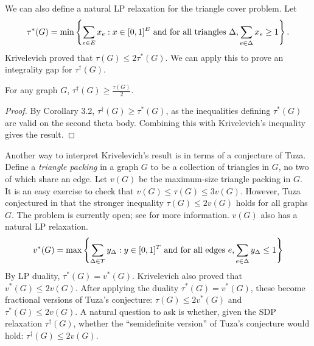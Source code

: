 We can also define a natural LP relaxation for the triangle cover problem. Let
$$\tau^*(G) = \min \left\{\sum_{e \in E} x_e: x \in [0,1]^E \hbox{ and for all triangles $\Delta$,} \sum_{e \in \Delta} x_e \ge 1\right\}.$$
Krivelevich \cite{krivelevich} proved that $\tau(G) \le 2\tau^*(G)$. We can apply this to prove an integrality gap for $\tau^\dagger(G)$.
\begin{theorem}
For any graph $G$, $\tau^\dagger(G) \ge \frac{\tau(G)}{2}$.
\end{theorem}
\begin{proof}
By Corollary 3.2, $\tau^\dagger(G) \ge \tau^*(G)$, as the inequalities defining $\tau^*(G)$ are valid on the second theta body. Combining this with Krivelevich's inequality gives the result.
\end{proof}

Another way to interpret Krivelevich's result is in terms of a conjecture of Tuza. Define a {\it triangle packing} in a graph $G$ to be a collection of triangles in $G$, no two of which share an edge. Let $v(G)$ be the maximum-size triangle packing in $G$. It is an easy exercise to check that $v(G) \le \tau(G) \le 3v(G)$. However, Tuza conjectured in \cite{tuza} that the stronger inequality $\tau(G) \le 2v(G)$ holds for all graphs $G$. The problem is currently open; see \cite{haxell} for more information. $v(G)$ also has a natural LP relaxation.
$$v^*(G) = \max \left\{\sum_{\Delta \in T} y_\Delta: y \in [0,1]^T \hbox{ and for all edges $e$,} \sum_{e \in \Delta} y_\Delta \le 1\right\}$$
By LP duality, $\tau^*(G) = v^*(G)$. Krivelevich \cite{krivelevich} also proved that  $v^*(G) \le 2v(G)$. After applying the duality $\tau^*(G) = v^*(G)$, these become fractional versions of Tuza's conjecture: $\tau(G) \le 2v^*(G)$ and $\tau^*(G) \le 2v(G)$. A natural question to ask is whether, given the SDP relaxation $\tau^\dagger(G)$, whether the ``semidefinite version'' of Tuza's conjecture would hold: $\tau^\dagger(G) \le 2v(G)$.